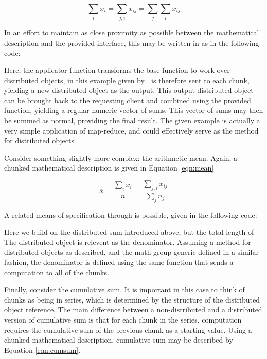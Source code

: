 \documentclass[letterpaper, inpress]{jds} %
\begin{document}
\begin{equation}\label{eqn:sum}
    \sum_i x_i= \sum_{j,i}x_{ij} = \sum_j\sum_i x_{ij}
\end{equation}

In an effort to maintain as close proximity as possible between the mathematical description and the provided interface, this may be written in  as in the following  code:


Here, the  applicator function transforms the base  function to work over distributed objects, in this example given by .
 is therefore sent to each chunk, yielding a new distributed object as the output.
This output distributed object can be brought back to the requesting client and combined using the provided  function, yielding a regular  numeric vector of sums.
This vector of sums may then be summed as normal, providing the final result.
The given example is actually a very simple application of map-reduce, and could effectively serve as the  method for distributed objects

Consider something slightly more complex: the arithmetic mean.
Again, a chunked mathematical description is given in Equation \ref{eqn:mean}

\begin{equation}\label{eqn:mean}
    \overline{x} = \frac{\sum_{i}x_{i}}{n} = \frac{\sum_{j,i}x_{ij}}{\sum_j n_j}
\end{equation}

A related means of specification through  is possible, given in the following code:


Here we build on the distributed sum introduced above, but the total length of The distributed object is relevent as the denominator.
Assuming a  method for distributed objects as described, and the math group generic defined in a similar fashion, the denominator is defined using the same  function that sends a  computation to all of the chunks.

Finally, consider the cumulative sum.
It is important in this case to think of chunks as being in series, which is determined by the structure of the distributed object reference.
The main difference between a non-distributed and a distributed version of cumulative sum is that for each chunk in the series, computation requires the cumulative sum of the previous chunk as a starting value.
Using a chunked mathematical description, cumulative sum may be described by Equation \ref{eqn:cumsum}.
\end{document}
